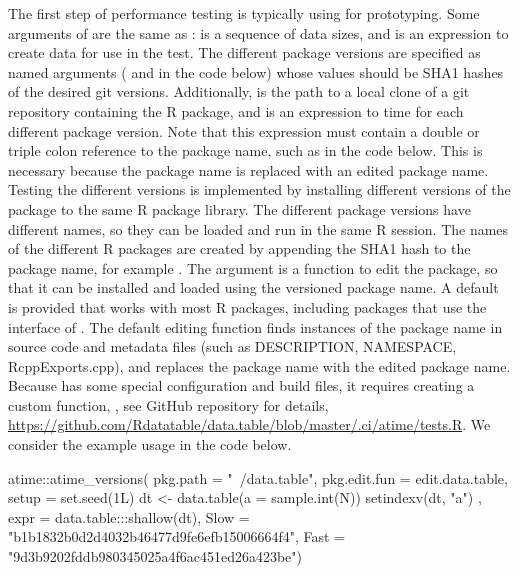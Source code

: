 The first step of performance testing is typically using  for prototyping.
Some arguments of  are the same as :  is a sequence of data sizes, and  is an expression to create data for use in the test. 
The different package versions are specified as named arguments ( and  in the code below) whose values should be SHA1 hashes of the desired git versions.
Additionally,  is the path to a local clone of a git repository containing the R package, and  is an expression to time for each different package version.
Note that this expression must contain a double or triple colon reference to the package name, such as  in the code below.
This is necessary because the package name is replaced with an edited package name.
Testing the different versions is implemented by installing different versions of the package to the same R package library.
The different package versions have different names, so they can be loaded and run in the same R session.
The names of the different R packages are created by appending the SHA1 hash to the package name, for example .
The  argument is a function to edit the package, so that it can be installed and loaded using the versioned package name.
A default  is provided that works with most R packages, including packages that use the  interface of \citet{Rcpp}.
The default editing function finds instances of the package name in source code and metadata files (such as DESCRIPTION, NAMESPACE, RcppExports.cpp), and replaces the package name with the edited package name.
Because  has some special configuration and build files, it requires creating a custom function, , see GitHub repository for details, \url{https://github.com/Rdatatable/data.table/blob/master/.ci/atime/tests.R}. 
We consider the example usage in the code below.
\begin{Schunk}
\begin{Sinput}
atime::atime_versions(
  pkg.path = "~/data.table",
  pkg.edit.fun = edit.data.table, 
  setup = {
    set.seed(1L)
    dt <- data.table(a = sample.int(N))
    setindexv(dt, "a")
  },
  expr = data.table:::shallow(dt),
  Slow = "b1b1832b0d2d4032b46477d9fe6efb15006664f4", 
  Fast = "9d3b9202fddb980345025a4f6ac451ed26a423be")
\end{Sinput}
\end{Schunk}
